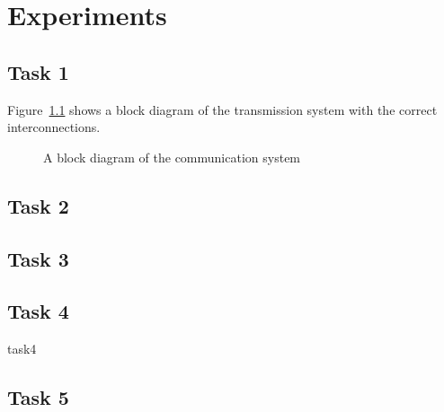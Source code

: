 \documentclass[11pt,titlepage]{report}
\begin{document}
\chapter{Experiments}
\section{Task 1}
Figure~\ref{fig:block-diagram} shows a block diagram of the transmission system with the correct interconnections.

\begin{figure}[H]
	\centering
	
	\caption{A block diagram of the communication system}
	\label{fig:block-diagram}
\end{figure}

\section{Task 2}

\section{Task 3}

\section{Task 4}
{task4}

\section{Task 5}
\end{document}
